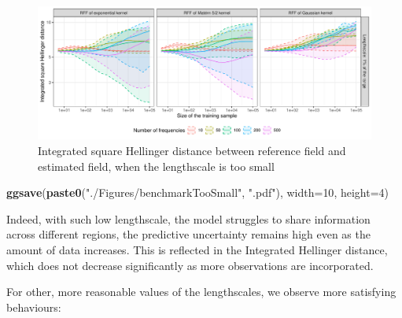 \documentclass[
]{article}
\newenvironment{Shaded}{\begin{snugshade}}{\end{snugshade}}
\newcommand{\AttributeTok}[1]{\textcolor[rgb]{0.13,0.29,0.53}{#1}}
\newcommand{\DecValTok}[1]{\textcolor[rgb]{0.00,0.00,0.81}{#1}}
\newcommand{\FunctionTok}[1]{\textcolor[rgb]{0.13,0.29,0.53}{\textbf{#1}}}
\newcommand{\NormalTok}[1]{#1}
\newcommand{\StringTok}[1]{\textcolor[rgb]{0.31,0.60,0.02}{#1}}
\begin{document}
\begin{figure}[H]

{\centering \includegraphics{IntroductionSLGP_files/figure-latex/PlotTooSmallLen-1} 

}

\caption{Integrated square Hellinger distance between reference field and estimated field, when the lengthscale is too small}\label{fig:PlotTooSmallLen}
\end{figure}

\begin{Shaded}
\begin{Highlighting}[]
\FunctionTok{ggsave}\NormalTok{(}\FunctionTok{paste0}\NormalTok{(}\StringTok{"./Figures/benchmarkTooSmall"}\NormalTok{,  }\StringTok{".pdf"}\NormalTok{), }\AttributeTok{width=}\DecValTok{10}\NormalTok{, }\AttributeTok{height=}\DecValTok{4}\NormalTok{)}
\end{Highlighting}
\end{Shaded}

Indeed, with such low lengthscale, the model struggles to share information across different regions, the predictive uncertainty remains high even as the amount of data increases. This is reflected in the Integrated Hellinger distance, which does not decrease significantly as more observations are incorporated.

For other, more reasonable values of the lengthscales, we observe more satisfying behaviours:
\end{document}
